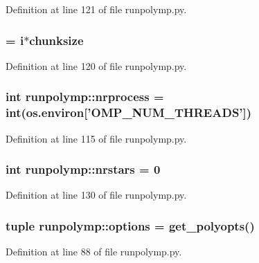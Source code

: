 Definition at line 121 of file runpolymp.py.

\hypertarget{namespacerunpolymp_a4618edf2a059e4987f52db767ffb6d4d}{
\subsubsection[{min}]{ = i$\ast${\bf chunksize}}}
\label{namespacerunpolymp_a4618edf2a059e4987f52db767ffb6d4d}


Definition at line 120 of file runpolymp.py.

\hypertarget{namespacerunpolymp_a61267842b66dc6998ce42d9c4446992b}{
\subsubsection[{nrprocess}]{\setlength{\rightskip}{0pt plus 5cm}int {\bf runpolymp::nrprocess} = int(os.environ\mbox{[}'OMP\_\-NUM\_\-THREADS'\mbox{]})}}
\label{namespacerunpolymp_a61267842b66dc6998ce42d9c4446992b}


Definition at line 115 of file runpolymp.py.

\hypertarget{namespacerunpolymp_a9bed810afed37bd8bc94fb240f3a836c}{
\subsubsection[{nrstars}]{\setlength{\rightskip}{0pt plus 5cm}int {\bf runpolymp::nrstars} = 0}}
\label{namespacerunpolymp_a9bed810afed37bd8bc94fb240f3a836c}


Definition at line 130 of file runpolymp.py.

\hypertarget{namespacerunpolymp_a1696f14ff027e064a7d29eece7f4b66d}{
\subsubsection[{options}]{\setlength{\rightskip}{0pt plus 5cm}tuple {\bf runpolymp::options} = get\_\-polyopts()}}
\label{namespacerunpolymp_a1696f14ff027e064a7d29eece7f4b66d}


Definition at line 88 of file runpolymp.py.

